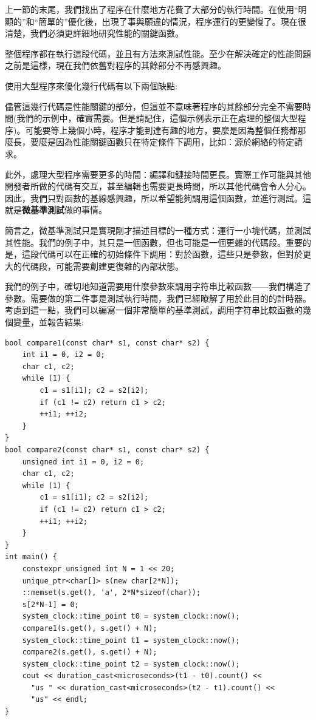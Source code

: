 
上一節的末尾，我們找出了程序在什麼地方花費了大部分的執行時間。在使用“明顯的”和“簡單的”優化後，出現了事與願違的情況，程序運行的更變慢了。現在很清楚，我們必須更詳細地研究性能的關鍵函數。

整個程序都在執行這段代碼，並且有方法來測試性能。至少在解決確定的性能問題之前是這樣，現在我們依舊對程序的其餘部分不再感興趣。

使用大型程序來優化幾行代碼有以下兩個缺點:

儘管這幾行代碼是性能關鍵的部分，但這並不意味著程序的其餘部分完全不需要時間(我們的示例中，確實需要。但是請記住，這個示例表示正在處理的整個大型程序)。可能要等上幾個小時，程序才能到達有趣的地方，要麼是因為整個任務都那麼長，要麼是因為性能關鍵函數只在特定條件下調用，比如：源於網絡的特定請求。

此外，處理大型程序需要更多的時間：編譯和鏈接時間更長。實際工作可能與其他開發者所做的代碼有交互，甚至編輯也需要更長時間，所以其他代碼會令人分心。因此，我們只對函數的基線感興趣，所以希望能夠調用這個函數，並進行測試。這就是\textbf{微基準測試}做的事情。


簡言之，微基準測試只是實現剛才描述目標的一種方式：運行一小塊代碼，並測試其性能。我們的例子中，其只是一個函數，但也可能是一個更雜的代碼段。重要的是，這段代碼可以在正確的初始條件下調用：對於函數，這些只是參數，但對於更大的代碼段，可能需要創建更復雜的內部狀態。

我們的例子中，確切地知道需要用什麼參數來調用字符串比較函數——我們構造了參數。需要做的第二件事是測試執行時間，我們已經瞭解了用於此目的的計時器。考慮到這一點，我們可以編寫一個非常簡單的基準測試，調用字符串比較函數的幾個變量，並報告結果:

\begin{lstlisting}[style=styleCXX]
bool compare1(const char* s1, const char* s2) {
	int i1 = 0, i2 = 0;
	char c1, c2;
	while (1) {
		c1 = s1[i1]; c2 = s2[i2];
		if (c1 != c2) return c1 > c2;
		++i1; ++i2;
	}
}
bool compare2(const char* s1, const char* s2) {
	unsigned int i1 = 0, i2 = 0;
	char c1, c2;
	while (1) {
		c1 = s1[i1]; c2 = s2[i2];
		if (c1 != c2) return c1 > c2;
		++i1; ++i2;
	}
}
int main() {
	constexpr unsigned int N = 1 << 20;
	unique_ptr<char[]> s(new char[2*N]);
	::memset(s.get(), 'a', 2*N*sizeof(char));
	s[2*N-1] = 0;
	system_clock::time_point t0 = system_clock::now();
	compare1(s.get(), s.get() + N);
	system_clock::time_point t1 = system_clock::now();
	compare2(s.get(), s.get() + N);
	system_clock::time_point t2 = system_clock::now();
	cout << duration_cast<microseconds>(t1 - t0).count() <<
	  "us " << duration_cast<microseconds>(t2 - t1).count() <<
	  "us" << endl;
}
\end{lstlisting}

